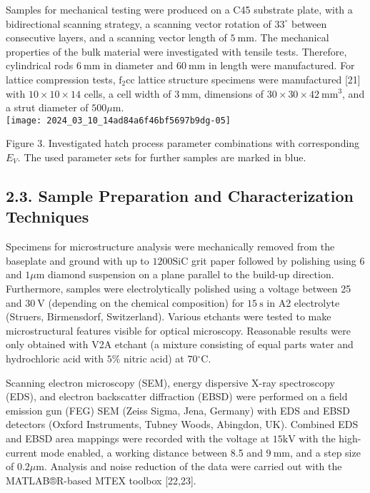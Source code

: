 \documentclass[10pt]{article}
\begin{document}
Samples for mechanical testing were produced on a C45 substrate plate, with a bidirectional scanning strategy, a scanning vector rotation of $33^{\circ}$ between consecutive layers, and a scanning vector length of $5 \mathrm{~mm}$. The mechanical properties of the bulk material were investigated with tensile tests. Therefore, cylindrical rods $6 \mathrm{~mm}$ in diameter and $60 \mathrm{~mm}$ in length were manufactured. For lattice compression tests, $\mathrm{f}_{2} \mathrm{cc}$ lattice structure specimens were manufactured [21] with $10 \times 10 \times 14$ cells, a cell width of $3 \mathrm{~mm}$, dimensions of $30 \times 30 \times 42 \mathrm{~mm}^{3}$, and a strut diameter of $500 \mu \mathrm{m}$.\\
\texttt{[image: 2024\_03\_10\_14ad84a6f46bf5697b9dg-05]}

Figure 3. Investigated hatch process parameter combinations with corresponding $E_{V}$. The used parameter sets for further samples are marked in blue.

\subsection*{2.3. Sample Preparation and Characterization Techniques}
Specimens for microstructure analysis were mechanically removed from the baseplate and ground with up to $1200 \mathrm{SiC}$ grit paper followed by polishing using 6 and $1 \mu \mathrm{m}$ diamond suspension on a plane parallel to the build-up direction. Furthermore, samples were electrolytically polished using a voltage between 25 and $30 \mathrm{~V}$ (depending on the chemical composition) for $15 \mathrm{~s}$ in A2 electrolyte (Struers, Birmensdorf, Switzerland). Various etchants were tested to make microstructural features visible for optical microscopy. Reasonable results were only obtained with V2A etchant (a mixture consisting of equal parts water and hydrochloric acid with $5 \%$ nitric acid) at $70{ }^{\circ} \mathrm{C}$.

Scanning electron microscopy (SEM), energy dispersive X-ray spectroscopy (EDS), and electron backscatter diffraction (EBSD) were performed on a field emission gun (FEG) SEM (Zeiss Sigma, Jena, Germany) with EDS and EBSD detectors (Oxford Instruments, Tubney Woods, Abingdon, UK). Combined EDS and EBSD area mappings were recorded with the voltage at $15 \mathrm{kV}$ with the high-current mode enabled, a working distance between 8.5 and $9 \mathrm{~mm}$, and a step size of $0.2 \mu \mathrm{m}$. Analysis and noise reduction of the data were carried out with the MATLAB®R-based MTEX toolbox [22,23].
\end{document}

